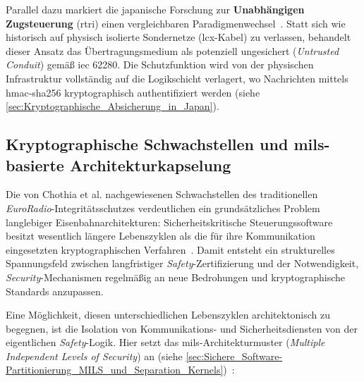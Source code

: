 \documentclass[runningheads]{res/llncs}
\begin{document}
Parallel dazu markiert die japanische Forschung zur \textbf{Unabhängigen Zugsteuerung} (\gls{rtri}) einen vergleichbaren Paradigmenwechsel~\parencite[S. 1--3]{iwamotoTrain2024}. Statt sich wie historisch auf physisch isolierte Sondernetze (\gls{lcx}-Kabel) zu verlassen, behandelt dieser Ansatz das Übertragungsmedium als potenziell ungesichert (\textit{Untrusted Conduit}) gemäß \gls{iec} 62280. Die Schutzfunktion wird von der physischen Infrastruktur vollständig auf die Logikschicht verlagert, wo Nachrichten mittels \gls{hmac-sha256} kryptographisch authentifiziert werden (siehe \autoref{sec:Kryptographische_Absicherung_in_Japan}).

\subsection{\texorpdfstring{Kryptographische Schwachstellen und \gls{mils}-basierte Architekturkapselung}{Kryptographische Schwachstellen und MILS-basierte Architekturkapselung}}
\label{sec:Kryptographische_Schwachstellen_und_MILS-basierte_Architekturkapselung}
Die von Chothia et al. nachgewiesenen Schwachstellen des traditionellen \textit{EuroRadio}-Integritätsschutzes verdeutlichen ein grundsätzliches Problem langlebiger Eisenbahnarchitekturen: Sicherheitskritische Steuerungssoftware besitzt wesentlich längere Lebenszyklen als die für ihre Kommunikation eingesetzten kryptographischen Verfahren~\parencite[S. 751--754]{chothiaAttack2017}. Damit entsteht ein strukturelles Spannungsfeld zwischen langfristiger \textit{Safety}-Zertifizierung und der Notwendigkeit, \textit{Security}-Mechanismen regelmäßig an neue Bedrohungen und kryptographische Standards anzupassen.

Eine Möglichkeit, diesen unterschiedlichen Lebenszyklen architektonisch zu begegnen, ist die Isolation von Kommunikations- und Sicherheitsdiensten von der eigentlichen \textit{Safety}-Logik. Hier setzt das \gls{mils}-Architekturmuster (\textit{Multiple Independent Levels of Security}) an (siehe \autoref{sec:Sichere_Software-Partitionierung_MILS_und_Separation_Kernels})~\parencite[S. 31--32]{schulzIntegration2019}:
\end{document}
